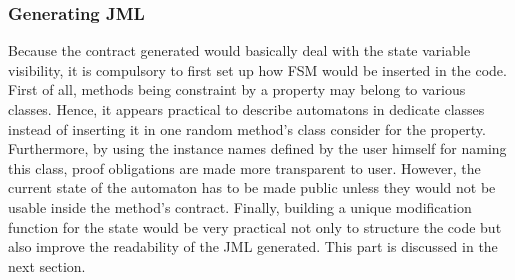 
\subsubsection{Generating JML}
Because the contract generated would basically deal with the state variable visibility, it is compulsory to first set up how FSM would be inserted in the code. First of all, methods being constraint by a property may belong to various classes. Hence, it appears practical to describe automatons in dedicate classes instead of inserting it in one random method's class consider for the property. Furthermore, by using the instance names defined by the user himself for naming this class, proof obligations are made more transparent to user. However, the current state of the automaton has to be made public unless they would not be usable inside the method's contract. Finally, building a unique modification function for the state would be very practical not only to structure the code but also improve the readability of the JML generated. This part is discussed in the next section.

